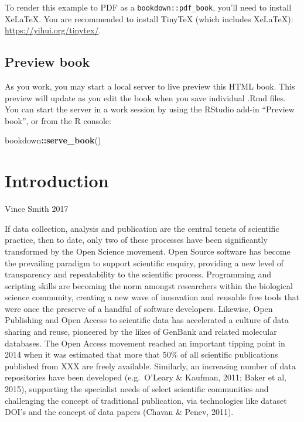 \documentclass[
]{book}
\newenvironment{Shaded}{\begin{snugshade}}{\end{snugshade}}
\newcommand{\FunctionTok}[1]{\textcolor[rgb]{0.13,0.29,0.53}{\textbf{#1}}}
\newcommand{\NormalTok}[1]{#1}
\newcommand{\SpecialCharTok}[1]{\textcolor[rgb]{0.81,0.36,0.00}{\textbf{#1}}}
\begin{document}
To render this example to PDF as a \texttt{bookdown::pdf\_book}, you'll need to install XeLaTeX. You are recommended to install TinyTeX (which includes XeLaTeX): \url{https://yihui.org/tinytex/}.

\section{Preview book}\label{preview-book}

As you work, you may start a local server to live preview this HTML book. This preview will update as you edit the book when you save individual .Rmd files. You can start the server in a work session by using the RStudio add-in ``Preview book'', or from the R console:

\begin{Shaded}
\begin{Highlighting}[]
\NormalTok{bookdown}\SpecialCharTok{::}\FunctionTok{serve\_book}\NormalTok{()}
\end{Highlighting}
\end{Shaded}

\chapter{Introduction}\label{introduction}

Vince Smith 2017

If data collection, analysis and publication are the central tenets of scientific practice, then to date, only two of these processes have been significantly transformed by the Open Science movement. Open Source software has become the prevailing paradigm to support scientific enquiry, providing a new level of transparency and repeatability to the scientific process. Programming and scripting skills are becoming the norm amongst researchers within the biological science community, creating a new wave of innovation and reusable free tools that were once the preserve of a handful of software developers. Likewise, Open Publishing and Open Access to scientific data has accelerated a culture of data sharing and reuse, pioneered by the likes of GenBank and related molecular databases. The Open Access movement reached an important tipping point in 2014 when it was estimated that more that 50\% of all scientific publications published from XXX are freely available. Similarly, an increasing number of data repositories have been developed (e.g.~O'Leary \& Kaufman, 2011; Baker et al, 2015), supporting the specialist needs of select scientific communities and challenging the concept of traditional publication, via technologies like dataset DOI's and the concept of data papers (Chavan \& Penev, 2011).
\end{document}
